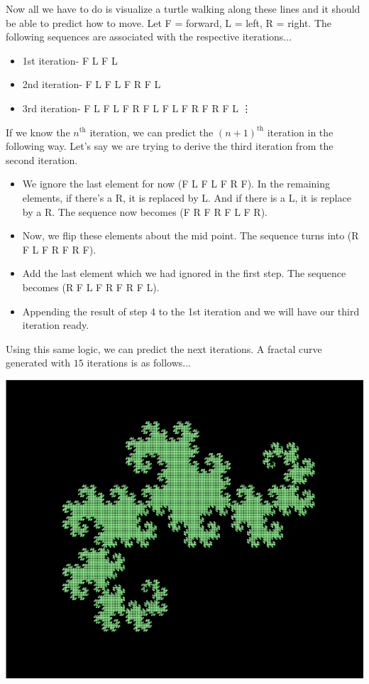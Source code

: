 \documentclass[cryptography,article,submit,moreauthors,pdftex]{Definitions/mdpi}
\begin{document}
\begin{flushleft}
    Now all we have to do is visualize a turtle walking along these lines and it should be able to predict how to move. Let F = forward, L = left, R = right. The following sequences are associated with the respective iterations...
    
    \begin{itemize}
        \item 1st iteration- F L F L
        \item 2nd iteration- F L F L F R F L
        \item 3rd iteration- F L F L F R F L F L F R F R F L
        \vdots
    \end{itemize}

If we know the $n^{\text{th}}$ iteration, we can predict the $(n+1)^{\text{th}}$ iteration in the following way. Let’s say we are trying to derive the third iteration from the second iteration.

    \begin{itemize}
        \item We ignore the last element for now (F L F L F R F). In the remaining elements, if there’s a R, it is replaced by L. And if there is a L, it is replace by a R. The sequence now becomes (F R F R F L F R).
        \item Now, we flip these elements about the mid point. The sequence turns into (R F L F R F R F).
        \item Add the last element which we had ignored in the first step. The sequence becomes (R F L F R F R F L).
        \item Appending the result of step 4 to the 1st iteration and we will have our third iteration ready.
    \end{itemize}

Using this same logic, we can predict the next iterations. A fractal curve generated with $15$ iterations is as follows...

\begin{center}
    \includegraphics[scale=0.58]{images/dragoncurve.png}
\end{center}
\end{flushleft}
\end{document}
